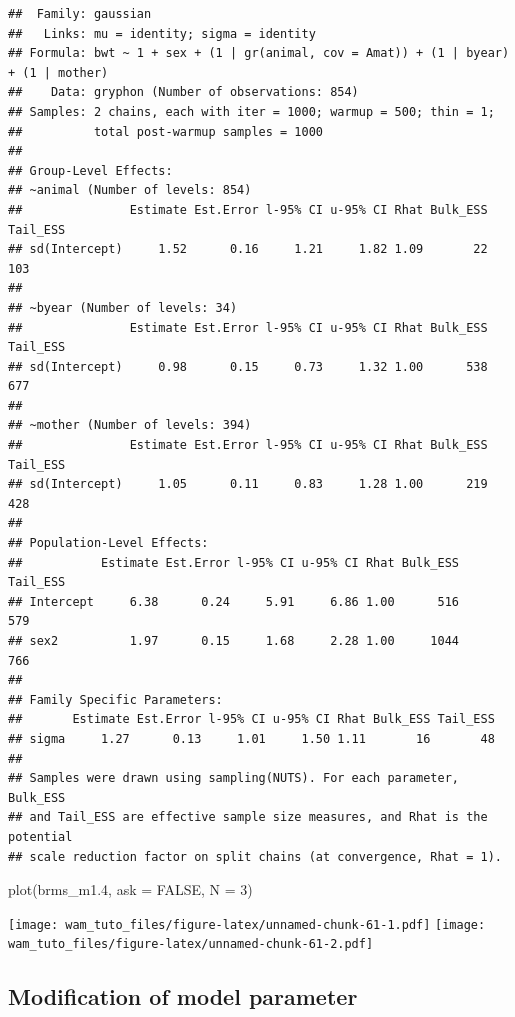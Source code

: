 \documentclass[
  12pt,
]{book}
\newenvironment{Shaded}{\begin{snugshade}}{\end{snugshade}}
\newcommand{\AttributeTok}[1]{\textcolor[rgb]{0.77,0.63,0.00}{#1}}
\newcommand{\ConstantTok}[1]{\textcolor[rgb]{0.00,0.00,0.00}{#1}}
\newcommand{\DecValTok}[1]{\textcolor[rgb]{0.00,0.00,0.81}{#1}}
\newcommand{\FloatTok}[1]{\textcolor[rgb]{0.00,0.00,0.81}{#1}}
\newcommand{\FunctionTok}[1]{\textcolor[rgb]{0.00,0.00,0.00}{#1}}
\newcommand{\NormalTok}[1]{#1}
\begin{document}
\begin{verbatim}
##  Family: gaussian 
##   Links: mu = identity; sigma = identity 
## Formula: bwt ~ 1 + sex + (1 | gr(animal, cov = Amat)) + (1 | byear) + (1 | mother) 
##    Data: gryphon (Number of observations: 854) 
## Samples: 2 chains, each with iter = 1000; warmup = 500; thin = 1;
##          total post-warmup samples = 1000
## 
## Group-Level Effects: 
## ~animal (Number of levels: 854) 
##               Estimate Est.Error l-95% CI u-95% CI Rhat Bulk_ESS Tail_ESS
## sd(Intercept)     1.52      0.16     1.21     1.82 1.09       22      103
## 
## ~byear (Number of levels: 34) 
##               Estimate Est.Error l-95% CI u-95% CI Rhat Bulk_ESS Tail_ESS
## sd(Intercept)     0.98      0.15     0.73     1.32 1.00      538      677
## 
## ~mother (Number of levels: 394) 
##               Estimate Est.Error l-95% CI u-95% CI Rhat Bulk_ESS Tail_ESS
## sd(Intercept)     1.05      0.11     0.83     1.28 1.00      219      428
## 
## Population-Level Effects: 
##           Estimate Est.Error l-95% CI u-95% CI Rhat Bulk_ESS Tail_ESS
## Intercept     6.38      0.24     5.91     6.86 1.00      516      579
## sex2          1.97      0.15     1.68     2.28 1.00     1044      766
## 
## Family Specific Parameters: 
##       Estimate Est.Error l-95% CI u-95% CI Rhat Bulk_ESS Tail_ESS
## sigma     1.27      0.13     1.01     1.50 1.11       16       48
## 
## Samples were drawn using sampling(NUTS). For each parameter, Bulk_ESS
## and Tail_ESS are effective sample size measures, and Rhat is the potential
## scale reduction factor on split chains (at convergence, Rhat = 1).
\end{verbatim}

\begin{Shaded}
\begin{Highlighting}[]
\FunctionTok{plot}\NormalTok{(brms\_m1}\FloatTok{.4}\NormalTok{, }\AttributeTok{ask =} \ConstantTok{FALSE}\NormalTok{, }\AttributeTok{N =} \DecValTok{3}\NormalTok{)}
\end{Highlighting}
\end{Shaded}

\texttt{[image: wam\_tuto\_files/figure-latex/unnamed-chunk-61-1.pdf]} \texttt{[image: wam\_tuto\_files/figure-latex/unnamed-chunk-61-2.pdf]}

\hypertarget{modification-of-model-parameter-2}{%
\subsection{Modification of model parameter}\label{modification-of-model-parameter-2}}
\end{document}
